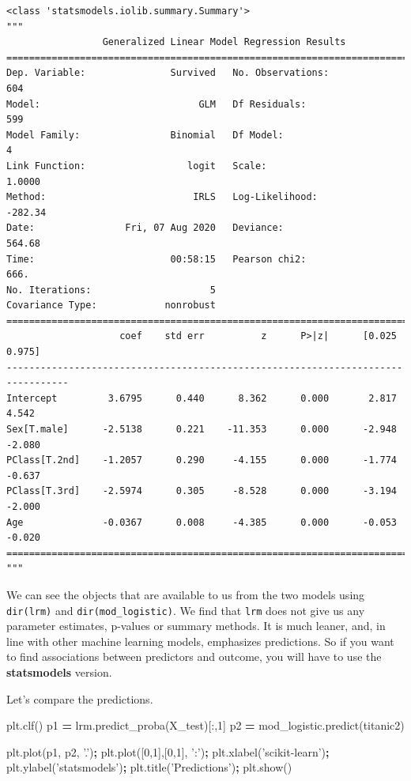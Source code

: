 \documentclass[
  letterpaper,
]{scrbook}
\newenvironment{Shaded}{\begin{snugshade}}{\end{snugshade}}
\newcommand{\DecValTok}[1]{\textcolor[rgb]{0.00,0.00,0.81}{#1}}
\newcommand{\NormalTok}[1]{#1}
\newcommand{\OperatorTok}[1]{\textcolor[rgb]{0.81,0.36,0.00}{\textbf{#1}}}
\newcommand{\StringTok}[1]{\textcolor[rgb]{0.31,0.60,0.02}{#1}}
\begin{document}
\begin{verbatim}
<class 'statsmodels.iolib.summary.Summary'>
"""
                 Generalized Linear Model Regression Results                  
==============================================================================
Dep. Variable:               Survived   No. Observations:                  604
Model:                            GLM   Df Residuals:                      599
Model Family:                Binomial   Df Model:                            4
Link Function:                  logit   Scale:                          1.0000
Method:                          IRLS   Log-Likelihood:                -282.34
Date:                Fri, 07 Aug 2020   Deviance:                       564.68
Time:                        00:58:15   Pearson chi2:                     666.
No. Iterations:                     5                                         
Covariance Type:            nonrobust                                         
=================================================================================
                    coef    std err          z      P>|z|      [0.025      0.975]
---------------------------------------------------------------------------------
Intercept         3.6795      0.440      8.362      0.000       2.817       4.542
Sex[T.male]      -2.5138      0.221    -11.353      0.000      -2.948      -2.080
PClass[T.2nd]    -1.2057      0.290     -4.155      0.000      -1.774      -0.637
PClass[T.3rd]    -2.5974      0.305     -8.528      0.000      -3.194      -2.000
Age              -0.0367      0.008     -4.385      0.000      -0.053      -0.020
=================================================================================
"""
\end{verbatim}

We can see the objects that are available to us from the two models using
\texttt{dir(lrm)} and \texttt{dir(mod\_logistic)}. We find that \texttt{lrm} does not give us
any parameter estimates, p-values or summary methods. It is much leaner, and, in line with other machine learning models, emphasizes predictions. So if you want to find associations between predictors and outcome, you will have to use the \textbf{statsmodels} version.

Let's compare the predictions.

\begin{Shaded}
\begin{Highlighting}[]
\NormalTok{plt.clf()}
\NormalTok{p1 }\OperatorTok{=}\NormalTok{ lrm.predict_proba(X_test)[:,}\DecValTok{1}\NormalTok{]}
\NormalTok{p2 }\OperatorTok{=}\NormalTok{ mod_logistic.predict(titanic2)}

\NormalTok{plt.plot(p1, p2, }\StringTok{'.'}\NormalTok{)}\OperatorTok{;}
\NormalTok{plt.plot([}\DecValTok{0}\NormalTok{,}\DecValTok{1}\NormalTok{],[}\DecValTok{0}\NormalTok{,}\DecValTok{1}\NormalTok{], }\StringTok{':'}\NormalTok{)}\OperatorTok{;}
\NormalTok{plt.xlabel(}\StringTok{'scikit-learn'}\NormalTok{)}\OperatorTok{;}
\NormalTok{plt.ylabel(}\StringTok{'statsmodels'}\NormalTok{)}\OperatorTok{;}
\NormalTok{plt.title(}\StringTok{'Predictions'}\NormalTok{)}\OperatorTok{;}
\NormalTok{plt.show()}
\end{Highlighting}
\end{Shaded}
\end{document}
